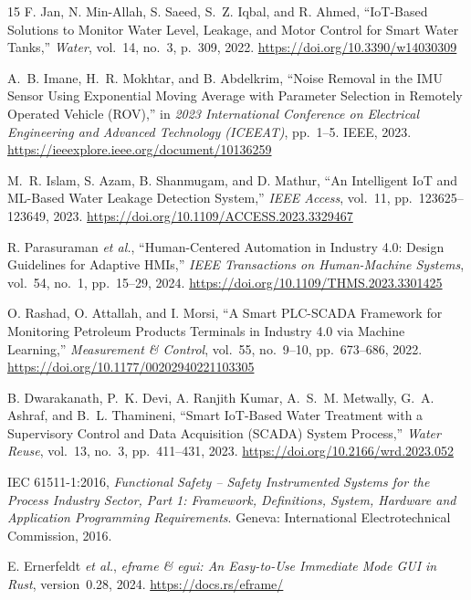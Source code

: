 \documentclass[12pt,a4paper]{article}
\begin{document}
\begin{thebibliography}{15}
F. Jan, N. Min-Allah, S. Saeed, S.~Z. Iqbal, and R. Ahmed,
``IoT-Based Solutions to Monitor Water Level, Leakage, and Motor Control for Smart Water Tanks,''
\textit{Water}, vol.~14, no.~3, p.~309, 2022.
\url{https://doi.org/10.3390/w14030309}

A.~B. Imane, H.~R. Mokhtar, and B. Abdelkrim,
``Noise Removal in the IMU Sensor Using Exponential Moving Average with Parameter Selection in Remotely Operated Vehicle (ROV),''
in \textit{2023 International Conference on Electrical Engineering and Advanced Technology (ICEEAT)},
pp.~1--5. IEEE, 2023.
\url{https://ieeexplore.ieee.org/document/10136259}

M.~R. Islam, S. Azam, B. Shanmugam, and D. Mathur,
``An Intelligent IoT and ML-Based Water Leakage Detection System,''
\textit{IEEE Access}, vol.~11, pp.~123625--123649, 2023.
\url{https://doi.org/10.1109/ACCESS.2023.3329467}

R. Parasuraman \textit{et al.},
``Human-Centered Automation in Industry 4.0: Design Guidelines for Adaptive HMIs,''
\textit{IEEE Transactions on Human-Machine Systems},
vol.~54, no.~1, pp.~15--29, 2024.
\url{https://doi.org/10.1109/THMS.2023.3301425}

O. Rashad, O. Attallah, and I. Morsi,
``A Smart PLC-SCADA Framework for Monitoring Petroleum Products Terminals in Industry 4.0 via Machine Learning,''
\textit{Measurement \& Control}, vol.~55, no.~9--10, pp.~673--686, 2022.
\url{https://doi.org/10.1177/00202940221103305}

B. Dwarakanath, P.~K. Devi, A. Ranjith Kumar, A.~S.~M. Metwally, G.~A. Ashraf, and B.~L. Thamineni,
``Smart IoT-Based Water Treatment with a Supervisory Control and Data Acquisition (SCADA) System Process,''
\textit{Water Reuse}, vol.~13, no.~3, pp.~411--431, 2023.
\url{https://doi.org/10.2166/wrd.2023.052}

IEC 61511-1:2016,
\textit{Functional Safety -- Safety Instrumented Systems for the Process Industry Sector,
Part 1: Framework, Definitions, System, Hardware and Application Programming Requirements}.
Geneva: International Electrotechnical Commission, 2016.

E. Ernerfeldt \textit{et al.},
\textit{eframe \& egui: An Easy-to-Use Immediate Mode GUI in Rust},
version~0.28, 2024.
\url{https://docs.rs/eframe/}

\end{thebibliography}
\end{document}
